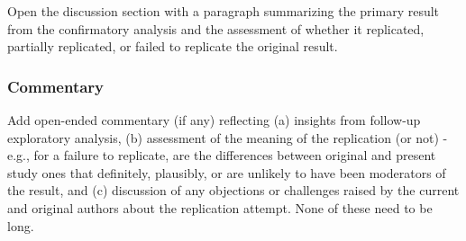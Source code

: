 \documentclass[
  letterpaper,
  DIV=11,
  numbers=noendperiod]{scrartcl}
\begin{document}
Open the discussion section with a paragraph summarizing the primary
result from the confirmatory analysis and the assessment of whether it
replicated, partially replicated, or failed to replicate the original
result.

\subsubsection{Commentary}\label{commentary}

Add open-ended commentary (if any) reflecting (a) insights from
follow-up exploratory analysis, (b) assessment of the meaning of the
replication (or not) - e.g., for a failure to replicate, are the
differences between original and present study ones that definitely,
plausibly, or are unlikely to have been moderators of the result, and
(c) discussion of any objections or challenges raised by the current and
original authors about the replication attempt. None of these need to be
long.
\end{document}
